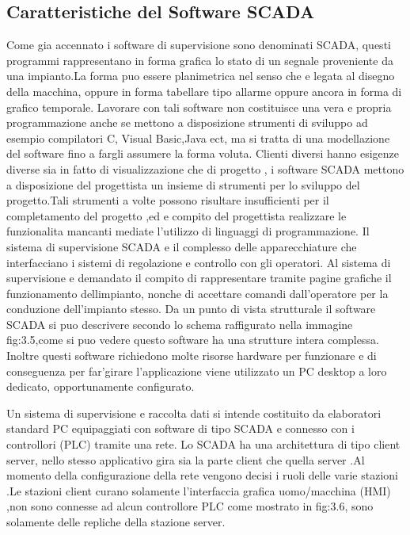 \documentclass[12pt, a4paper, oneside]{book}
\begin{document}
\subsection{Caratteristiche del Software SCADA}
Come gia accennato i software di supervisione sono denominati SCADA, questi programmi rappresentano in forma grafica lo stato di un segnale proveniente da una impianto.La forma puo essere planimetrica nel senso che e legata al disegno della macchina, oppure in forma tabellare tipo allarme oppure ancora in forma di grafico temporale. Lavorare con tali software non costituisce una vera e propria programmazione anche se mettono a disposizione strumenti di sviluppo ad esempio compilatori C, Visual Basic,Java ect, ma si tratta di una modellazione del software fino a fargli assumere la forma voluta. Clienti diversi hanno esigenze diverse sia in fatto di visualizzazione che di progetto , i software SCADA mettono a disposizione del progettista un insieme di strumenti per lo sviluppo del progetto.Tali strumenti a volte possono risultare insufficienti per il completamento del progetto ,ed e compito del progettista realizzare le funzionalita mancanti mediate l’utilizzo di linguaggi di programmazione. Il sistema di supervisione SCADA e il complesso delle apparecchiature che interfacciano i sistemi di regolazione e controllo con gli operatori. Al sistema di supervisione e demandato il compito di rappresentare tramite pagine grafiche il funzionamento dellimpianto, nonche di accettare comandi dall’operatore per la conduzione dell’impianto stesso. Da un punto di vista strutturale il software SCADA si puo descrivere secondo lo schema raffigurato nella immagine fig:3.5,come si puo vedere questo software ha una strutture intera complessa. Inoltre questi software richiedono molte risorse hardware per funzionare e di conseguenza per far’girare l’applicazione viene utilizzato un PC desktop a loro dedicato, opportunamente configurato.

Un sistema di supervisione e raccolta dati si intende costituito da elaboratori standard PC equipaggiati con software di tipo SCADA e connesso con i controllori (PLC) tramite una rete. Lo SCADA ha una architettura di tipo client server, nello stesso applicativo gira sia la parte client che quella server .Al momento della configurazione della rete vengono decisi i ruoli delle varie stazioni .Le stazioni
client curano solamente l’interfaccia grafica uomo/macchina (HMI) ,non sono connesse ad alcun controllore PLC come mostrato in fig:3.6, sono solamente delle repliche della stazione server.
\end{document}
